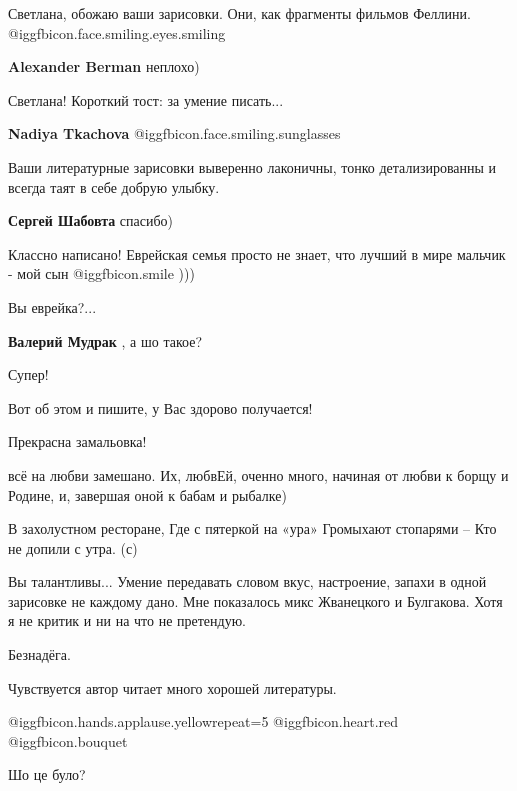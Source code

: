 \begin{itemize}
Светлана, обожаю ваши зарисовки. Они, как фрагменты фильмов Феллини.
@igg{fbicon.face.smiling.eyes.smiling} 

\textbf{Alexander Berman} неплохо)

Светлана! Короткий тост: за умение писать...

\textbf{Nadiya Tkachova}  @igg{fbicon.face.smiling.sunglasses} 


Ваши литературные зарисовки выверенно лаконичны, тонко детализированны и всегда
таят в себе добрую улыбку.


\textbf{Сергей Шабовта} спасибо)

Классно написано!
Еврейская семья просто не знает, что лучший в мире мальчик - мой сын  @igg{fbicon.smile}  )))

\begin{itemize} %
Вы еврейка?...

\textbf{Валерий Мудрак} , а шо такое?
\end{itemize} %

Супер!

Вот об этом и пишите, у Вас здорово получается!

Прекрасна замальовка!


всё на любви замешано. Их, любвЕй, оченно много, начиная от любви к борщу и
Родине, и, завершая оной к бабам и рыбалке)

В захолустном ресторане,
Где с пятеркой на «ура»
Громыхают стопарями –
Кто не допили с утра. (с)


Вы талантливы... Умение передавать словом вкус, настроение, запахи в одной
зарисовке не каждому дано. Мне показалось микс Жванецкого и Булгакова. Хотя я не
критик и ни на что не претендую.

Безнадёга.

Чувствуется автор читает много хорошей литературы.

 @igg{fbicon.hands.applause.yellow}{repeat=5} @igg{fbicon.heart.red} @igg{fbicon.bouquet} 

Шо це було?


\end{itemize}
